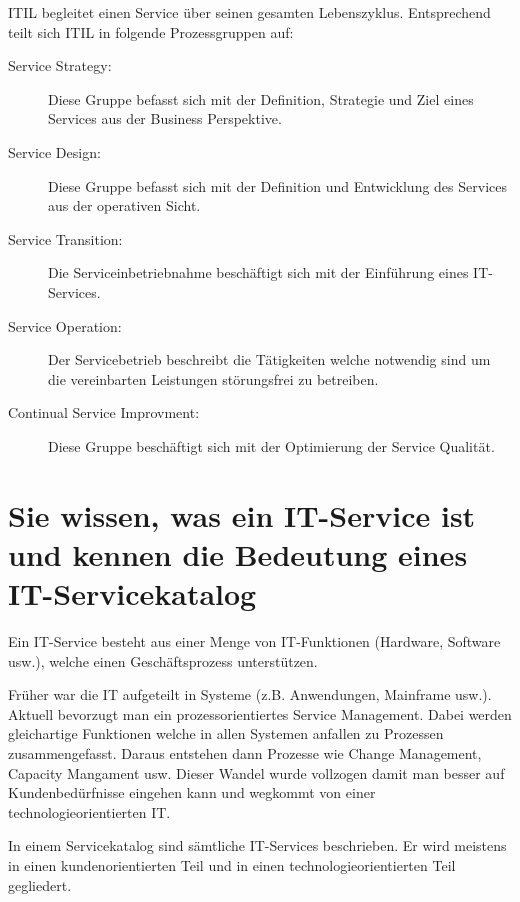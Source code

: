 ITIL begleitet einen Service über seinen gesamten Lebenszyklus. Entsprechend teilt sich ITIL in folgende Prozessgruppen auf:
\begin{description}
	\item[Service Strategy:] Diese Gruppe befasst sich mit der Definition, Strategie und Ziel eines Services aus der Business Perspektive.
	\item[Service Design:] Diese Gruppe befasst sich mit der Definition und Entwicklung des Services aus der operativen Sicht.
	\item[Service Transition:] Die Serviceinbetriebnahme beschäftigt sich mit der Einführung eines IT-Services.
	\item[Service Operation:] Der Servicebetrieb beschreibt die Tätigkeiten welche notwendig sind um die vereinbarten Leistungen störungsfrei zu betreiben.
	\item[Continual Service Improvment:] Diese Gruppe beschäftigt sich mit der Optimierung der Service Qualität.
\end{description}

\section{Sie wissen, was ein IT-Service ist und kennen die Bedeutung eines IT-Servicekatalog}

Ein IT-Service besteht aus einer Menge von IT-Funktionen (Hardware, Software usw.), welche einen Geschäftsprozess unterstützen. 

Früher war die IT aufgeteilt in Systeme (z.B. Anwendungen, Mainframe usw.). Aktuell bevorzugt man ein prozessorientiertes Service Management. Dabei werden gleichartige Funktionen welche in allen Systemen anfallen zu Prozessen zusammengefasst. Daraus entstehen dann Prozesse wie Change Management, Capacity Mangament usw. Dieser Wandel wurde vollzogen damit man besser auf Kundenbedürfnisse eingehen kann und wegkommt von einer technologieorientierten IT.

In einem Servicekatalog sind sämtliche IT-Services beschrieben. Er wird meistens in einen kundenorientierten Teil und in einen technologieorientierten Teil gegliedert.